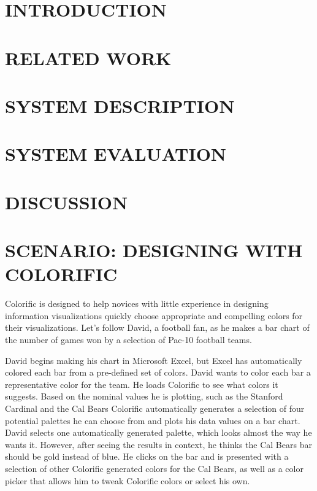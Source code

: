 \documentclass{article}
\newcommand{\system}{Colorific\xspace}
\begin{document}



\section{INTRODUCTION}


\section{RELATED WORK}

\section{SYSTEM DESCRIPTION}

\section{SYSTEM EVALUATION}

\section{DISCUSSION}


\section{SCENARIO: DESIGNING WITH COLORIFIC}
\system is designed to help novices with little experience in designing information visualizations quickly choose appropriate and compelling colors for their visualizations. Let's follow David, a football fan, as he makes a bar chart of the number of games won by a selection of Pac-10 football teams. 

David begins making his chart in Microsoft Excel, but Excel has automatically colored each bar from a pre-defined set of colors. David wants to color each bar a representative color for the team. He loads \system to see what colors it suggests. Based on the nominal values he is plotting, such as the Stanford Cardinal and the Cal Bears \system automatically generates a selection of four potential palettes he can choose from and plots his data values on a bar chart. David selects one automatically generated palette, which looks almost the way he wants it. However, after seeing the results in context, he thinks the Cal Bears bar should be gold instead of blue. He clicks on the bar and is presented with a selection of other \system generated colors for the Cal Bears, as well as a color picker that allows him to tweak \system colors or select his own. 
\end{document}
